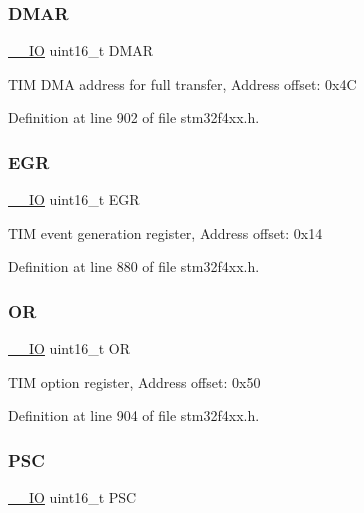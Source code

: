 \subsubsection{\texorpdfstring{D\+M\+AR}{DMAR}}
{\footnotesize\ttfamily \hyperlink{group___c_m_s_i_s__core__definitions_gaec43007d9998a0a0e01faede4133d6be}{\+\_\+\+\_\+\+IO} uint16\+\_\+t D\+M\+AR}

T\+IM D\+MA address for full transfer, Address offset\+: 0x4C 

Definition at line 902 of file stm32f4xx.\+h.

\mbox{\label{struct_t_i_m___type_def_a980df1a5752e36604de4d71ce14fbfa3}} 
\subsubsection{\texorpdfstring{E\+GR}{EGR}}
{\footnotesize\ttfamily \hyperlink{group___c_m_s_i_s__core__definitions_gaec43007d9998a0a0e01faede4133d6be}{\+\_\+\+\_\+\+IO} uint16\+\_\+t E\+GR}

T\+IM event generation register, Address offset\+: 0x14 

Definition at line 880 of file stm32f4xx.\+h.

\mbox{\label{struct_t_i_m___type_def_a47766f433b160258ec05dbb6498fd271}} 
\subsubsection{\texorpdfstring{OR}{OR}}
{\footnotesize\ttfamily \hyperlink{group___c_m_s_i_s__core__definitions_gaec43007d9998a0a0e01faede4133d6be}{\+\_\+\+\_\+\+IO} uint16\+\_\+t OR}

T\+IM option register, Address offset\+: 0x50 

Definition at line 904 of file stm32f4xx.\+h.

\mbox{\label{struct_t_i_m___type_def_aba5df4ecbb3ecb97b966b188c3681600}} 
\subsubsection{\texorpdfstring{P\+SC}{PSC}}
{\footnotesize\ttfamily \hyperlink{group___c_m_s_i_s__core__definitions_gaec43007d9998a0a0e01faede4133d6be}{\+\_\+\+\_\+\+IO} uint16\+\_\+t P\+SC}

